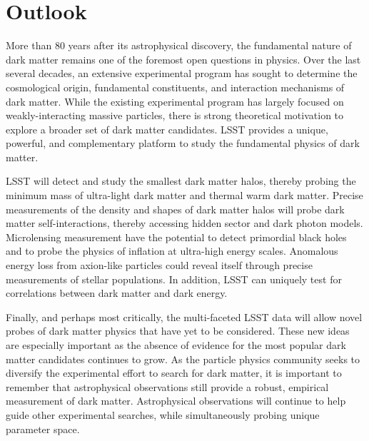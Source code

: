 \section{Outlook}
\label{sec:outlook}

More than 80 years after its astrophysical discovery, the fundamental nature of dark matter remains one of the foremost open questions in physics.
Over the last several decades, an extensive experimental program has sought to determine the cosmological origin, fundamental constituents, and interaction mechanisms of dark matter. 
While the existing experimental program has largely focused on weakly-interacting massive particles, there is strong theoretical motivation to explore a broader set of dark matter candidates.
LSST provides a unique, powerful, and complementary platform to study the fundamental physics of dark matter.

LSST will detect and study the smallest dark matter halos, thereby probing the minimum mass of ultra-light dark matter and thermal warm dark matter.
Precise measurements of the density and shapes of dark matter halos will probe dark matter self-interactions, thereby accessing hidden sector and dark photon models.
Microlensing measurement have the potential to detect primordial black holes and to probe the physics of inflation at ultra-high energy scales.
Anomalous energy loss from axion-like particles could reveal itself through precise measurements of stellar populations.
In addition, LSST can uniquely test for correlations between dark matter and dark energy.

Finally, and perhaps most critically, the multi-faceted LSST data will allow novel probes of dark matter physics that have yet to be considered.
These new ideas are especially important as the absence of evidence for the most popular dark matter candidates continues to grow.
As the particle physics community seeks to diversify the experimental effort to search for dark matter, it is important to remember that astrophysical observations still provide a robust, empirical measurement of dark matter.
Astrophysical observations will continue to help guide other experimental searches, while simultaneously probing unique parameter space.


